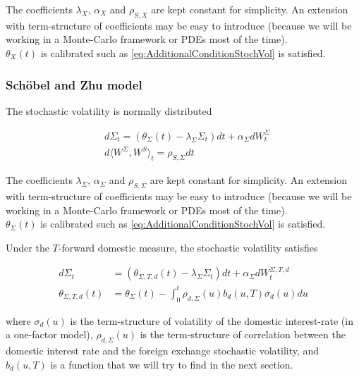 \documentclass{article}
\begin{document}
\noindent The coefficients $\lambda_X$, $\alpha_X$ and $\rho_{S,X}$ are kept constant for simplicity. An extension with term-structure of coefficients may be easy to introduce (because we will be working in a Monte-Carlo framework or PDEs most of the time).\\

\noindent $\theta_X(t)$ is calibrated such as \ref{eq:AdditionalConditionStochVol} is satisfied.

\subsubsection{Schöbel and Zhu model}
The stochastic volatility is normally distributed

\begin{equation}
	\begin{aligned}
		&d\Sigma_t = \left(\theta_\Sigma(t) - \lambda_\Sigma \Sigma_t\right) dt + \alpha_\Sigma dW_t^\Sigma\\
		&d\langle W^\Sigma, W^S\rangle_t = \rho_{S,\Sigma} dt
	\end{aligned}
\end{equation}

\noindent The coefficients $\lambda_\Sigma$, $\alpha_\Sigma$ and $\rho_{S,\Sigma}$ are kept constant for simplicity. An extension with term-structure of coefficients may be easy to introduce (because we will be working in a Monte-Carlo framework or PDEs most of the time).\\

\noindent $\theta_\Sigma(t)$ is calibrated such as \ref{eq:AdditionalConditionStochVol} is satisfied.

\noindent Under the $T$-forward domestic measure, the stochastic volatility satisfies

\begin{equation}
\begin{aligned}
	d\Sigma_t &= \left(\theta_{\Sigma,T,d}(t) - \lambda_\Sigma \Sigma_t\right) dt + \alpha_\Sigma dW_t^{\Sigma,T,d}\\
	\theta_{\Sigma,T,d}(t) &= \theta_\Sigma(t) -\int_{0}^{t}  \rho_{d,\Sigma}(u) b_d(u,T) \sigma_d(u) du
\end{aligned}
\end{equation}

where $\sigma_d(u)$ is the term-structure of volatility of the domestic interest-rate (in a one-factor model), $\rho_{d, \Sigma}(u)$ is the term-structure of correlation between the domestic interest rate and the foreign exchange stochastic volatility, and $b_d(u,T)$ is a function that we will try to find in the next section.
\end{document}
